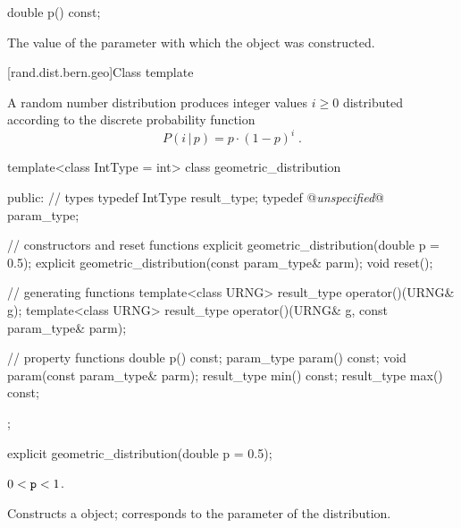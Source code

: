 %
%
\begin{itemdecl}
double p() const;
\end{itemdecl}

\begin{itemdescr}
\pnum\returns The value of the  parameter
 with which the object was constructed.
\end{itemdescr}


[rand.dist.bern.geo]{Class template }

\pnum
A  random number distribution
produces integer values $i \geq 0$
distributed according to
the discrete probability function
%
\[%
 P(i\,|\,p)
      = p \cdot (1-p)^{i}
\; \mbox{.}
\]

\begin{codeblock}
template<class IntType = int>
 class geometric_distribution
{
public:
 // types
 typedef IntType result_type;
 typedef @\textit{unspecified}@ param_type;

 // constructors and reset functions
 explicit geometric_distribution(double p = 0.5);
 explicit geometric_distribution(const param_type& parm);
 void reset();

 // generating functions
 template<class URNG>
   result_type operator()(URNG& g);
 template<class URNG>
   result_type operator()(URNG& g, const param_type& parm);

 // property functions
 double p() const;
 param_type param() const;
 void param(const param_type& parm);
 result_type min() const;
 result_type max() const;
 };
\end{codeblock}


%
\begin{itemdecl}
explicit geometric_distribution(double p = 0.5);
\end{itemdecl}

\begin{itemdescr}
\pnum\requires
 $0 < \texttt{p} < 1$.

\pnum\effects Constructs a  object;
 corresponds to the parameter of the distribution.
\end{itemdescr}

